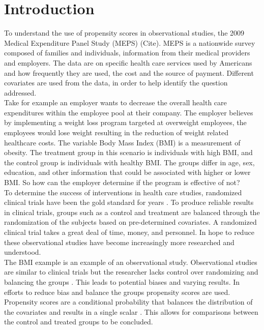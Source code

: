 \documentclass[11pt,twocolumn]{article}
\begin{document}
\section{Introduction}
\setlength{\parindent}{.75cm}
To understand the use of propensity scores in observational studies, the 2009 Medical Expenditure Panel Study (MEPS) (Cite). MEPS is a nationwide survey composed of families and individuals, information from their medical providers and employers. The data are on specific health care services used by Americans and how frequently they are used, the cost and the source of payment. Different covariates are used from the data, in order to help identify the question addressed.\\
\indent Take for example an employer wants to decrease the overall health care expenditures within the employee pool at their company. The employer believes by implementing a weight loss program targeted at overweight employees, the employees would lose weight resulting in the reduction of weight related healthcare costs. The variable Body Mass Index (BMI) is a measurement of obesity. The treatment group in this scenario is individuals with high BMI, and the control group is individuals with healthy BMI. The groups differ in age, sex, education, and other information that could be associated with higher or lower BMI. So how can the employer determine if the program is effective of not?\\
\indent To determine the success of interventions in health care studies, randomized clinical trials have been the gold standard for years \citep{cook2008introduction}. To produce reliable results in clinical trials, groups such as a control and treatment are balanced through the randomization of the subjects based on pre-determined covariates. A randomized clinical trial takes a great deal of time, money, and personnel. In hope to reduce these observational studies have become increasingly more researched and understood.\\
\indent The BMI example is an example of an observational study. Observational studies are similar to clinical trials but the researcher lacks control over randomizing and balancing the groups \citep{guo2009propensity}. This leads to potential biases and varying results. In efforts to reduce bias and balance the groups propensity scores are used. Propensity scores are a conditional probability that balances the distribution of the covariates and results in a single scalar \citep{rosenbaum1983central}. This allows for comparisons between the control and treated groups to be concluded.\\
\end{document}
